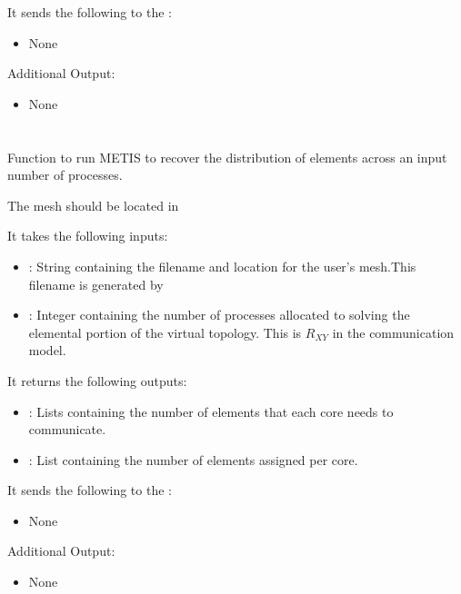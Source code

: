 It sends the following to the :

\begin{itemize}
\item None
\end{itemize}

Additional Output:
\begin{itemize}
\item None
\end{itemize}

\section{}

Function to run METIS to recover the distribution of elements across an input number of processes.

The mesh should be located in 

It takes the following inputs:

\begin{itemize}
\item {}: String containing the filename and location for the user's mesh.This filename is generated by 
\item {}: Integer containing the number of processes allocated to solving the elemental portion of the virtual topology. This is \(R_{XY}\) in the communication model.
\end{itemize}

It returns the following outputs:

\begin{itemize}
\item {}: Lists containing the number of elements that each core needs to communicate. 
\item {}: List containing the number of elements assigned per core.
\end{itemize}

It sends the following to the :

\begin{itemize}
\item None
\end{itemize}

Additional Output:
\begin{itemize}
\item None
\end{itemize}

